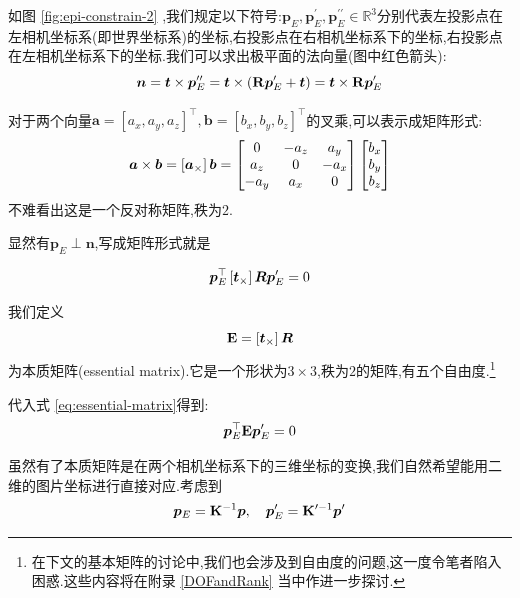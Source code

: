 如图 \ref{fig:epi-constrain-2} ,我们规定以下符号:$\bm p_E, \bm p_E^\prime, \bm p_E^{\prime\prime} \in \mathbb R^3$分别代表左投影点在左相机坐标系(即世界坐标系)的坐标,右投影点在右相机坐标系下的坐标,右投影点在左相机坐标系下的坐标.我们可以求出极平面的法向量(图中红色箭头):
\begin{equation}
	\bm n = \bm t \times \bm p_E^{\prime\prime} = \bm t \times \left( \bold{R} \bm p_E^{\prime} + \bm t\right) = \bm t \times \bold{R} \bm p_E^{\prime}
\end{equation}

对于两个向量$\bm a = [a_x, a_y, a_z]^\top, \bm b = [b_x, b_y, b_z]^\top$的叉乘,可以表示成矩阵形式:
\begin{equation}
	\bm a \times \bm b  = \left[ \bm a_{\times}\right]\bm b = 
	\begin{bmatrix}
		0 & - a_z & a_y
		\\
		a_z & 0 & -a_x
		\\
		-a_y & a_x & 0
	\end{bmatrix}
	\begin{bmatrix}
		b_x
		\\
		b_y
		\\
		b_z
	\end{bmatrix}
\end{equation}
不难看出这是一个反对称矩阵,秩为$2$.

显然有$\bm p_E \perp \bm n$,写成矩阵形式就是

\begin{equation}
	\bm p_E^\top \left[ \bm t_{\times}\right]\bm R \bm p^{\prime}_E = 0
	\label{eq:essential-matrix}
\end{equation}

我们定义
\begin{equation}
	\bold{E} = \left[ \bm t_{\times}\right]\bm R
\end{equation}
为本质矩阵(essential matrix).它是一个形状为$3 \times 3$,秩为$2$的矩阵,有五个自由度.\footnote{在下文的基本矩阵的讨论中,我们也会涉及到自由度的问题,这一度令笔者陷入困惑.这些内容将在附录 \ref{DOFandRank} 当中作进一步探讨.}

代入式 \ref{eq:essential-matrix}得到:
\begin{equation}
	\bm p_E^\top \bold{E} \bm p^{\prime}_E = 0
\end{equation}

虽然有了本质矩阵是在两个相机坐标系下的三维坐标的变换,我们自然希望能用二维的图片坐标进行直接对应.考虑到
\begin{equation}
	\bm p_E = \bold{K}^{-1} \bm p, \quad \bm p_E^\prime = \bold{K}^{\prime-1} \bm p^\prime
\end{equation}

